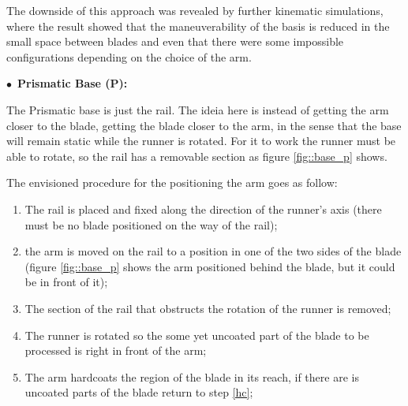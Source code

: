   
  The downside of this approach was revealed by further kinematic simulations,
  where the result showed that the maneuverability of the basis is reduced in
  the small space between blades and even that there were some impossible
  configurations depending on the choice of the arm.
  
  
$\bullet$~\textbf{Prismatic Base (P):}

  The Prismatic base is just the rail. The ideia here is instead of getting the
  arm closer to the blade, getting the blade closer to the arm, in the sense
  that the base will remain static while the runner is rotated. For it to work
  the runner must be able to rotate, so the rail has a removable section as
  figure \ref{fig::base_p} shows.
  
  The envisioned procedure for the positioning the arm goes as follow:
  \begin{enumerate}
    \item The rail is placed and fixed along the direction of the runner's axis
    (there must be no blade positioned on the way of the rail);
    \item the arm is moved on the rail to a
  position in one of the two sides of the blade (figure \ref{fig::base_p} shows the arm positioned behind the blade, but it could be
  in front of it);
  	\item The section of the rail that obstructs the rotation of the runner is
  	removed;
  	\item \label{hc} The runner is rotated so the some yet uncoated part of the
  	blade to be processed is right in front of the arm;
  	\item The arm hardcoats the region of the blade in its reach, if there are is
  	uncoated parts of the blade return to step \ref{hc}; 
       
  \end{enumerate}
  
